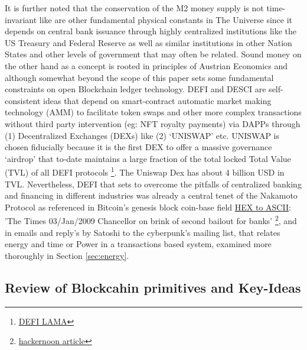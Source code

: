 \documentclass[final,5p,times,twocolumn,authoryear]{elsarticle}
\begin{document}
It is further noted that the conservation of the M2 money supply is not time-invariant like are other fundamental physical constants in The Universe since it depends on central bank issuance through highly centralized institutions like the US Treasury and Federal Reserve as well as similar institutions in other Nation States and other levels of  government that may often be related. Sound money on the other hand as a concept is rooted in principles of Austrian Economics and although somewhat beyond the scope of this paper sets some fundamental constraints on open Blockchain ledger technology. 
DEFI and DESCI are self-consistent ideas that depend on smart-contract automatic market making technology (AMM) to facilitate token swaps and other more complex transactions without third party intervention (eg: NFT royalty payments) via DAPPs through (1) Decentralized Exchanges (DEXs) like (2) `UNISWAP' etc. UNISWAP is chosen fiducially because it is the first DEX to offer a massive governance `airdrop' that to-date maintains a large fraction of the total locked Total Value (TVL) of all DEFI protocols  \footnote{\href{https://defillama.com/protocols/dexes}{DEFI LAMA}}. The Uniswap Dex has about 4 billion USD in TVL.   Nevertheless, DEFI that sets to overcome the pitfalls of centralized banking and financing in different industries was already a central tenet of the Nakamoto Protocol as referenced in Bitcoin's genesis block \textrm{coin-base field} \href{https://www.Blockchain.com/btc/tx/4a5e1e4baab89f3a32518a88c31bc87f618f76673e2cc77ab2127b7afdeda33b}{HEX to ASCII}:  'The Times 03/Jan/2009 Chancellor on brink of second bailout for banks' \footnote{\href{https://hackernoon.com/chancellor-on-brink-of-second-bailout-for-banks-where-to-find-this-on-the-bitcoin-blockchain-hm4k34v4}{ hackernoon article}}, and in emails and reply's by Satoshi to the cyberpunk's mailing list, that relates energy and time or Power in a transactions based system, examined more thoroughly in Section \ref{sec:energy}.

\subsection{Review of Blockcahin primitives and Key-Ideas}
\label{subsec: review}
\end{document}
